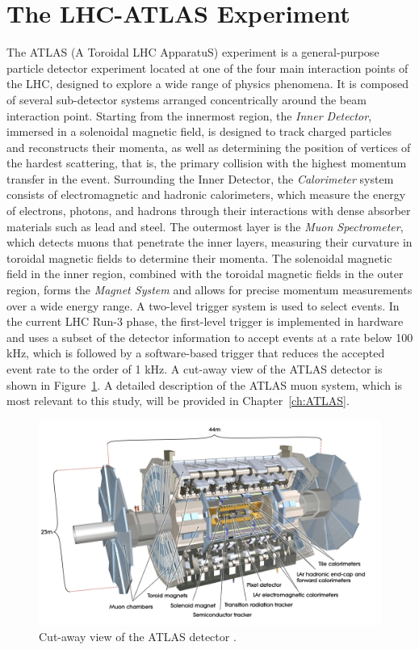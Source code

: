 \section{The LHC-ATLAS Experiment} \label{ATLAS}
The ATLAS (A Toroidal LHC ApparatuS) experiment is a general-purpose particle detector experiment located at one of the four main interaction points of the LHC, designed to explore a wide range of physics phenomena. It is composed of several sub-detector systems arranged concentrically around the beam interaction point. Starting from the innermost region, the \textit{Inner Detector}, immersed in a solenoidal magnetic field, is designed to track charged particles and reconstructs their momenta, as well as determining the position of vertices of the hardest scattering, that is, the primary collision with the highest momentum transfer in the event. Surrounding the Inner Detector, the \textit{Calorimeter} system consists of electromagnetic and hadronic calorimeters, which measure the energy of electrons, photons, and hadrons through their interactions with dense absorber materials such as lead and steel. The outermost layer is the \textit{Muon Spectrometer}, which detects muons that penetrate the inner layers, measuring their curvature in toroidal magnetic fields to determine their momenta. The solenoidal magnetic field in the inner region, combined with the toroidal magnetic fields in the outer region, forms the \textit{Magnet System} and allows for precise momentum measurements over a wide energy range. A two-level trigger system is used to select events. In the current LHC Run-3 phase, the first-level trigger is implemented in hardware and uses a subset of the detector information to accept events at a rate below 100 kHz, which is followed by a software-based trigger that reduces the accepted event rate to the order of 1 kHz. A cut-away view of the ATLAS detector is shown in Figure~\ref{fig:ATLASDetector}. A detailed description of the ATLAS muon system, which is most relevant to this study, will be provided in Chapter~\ref{ch:ATLAS}.
\begin{figure}[htbp]
  \centering
  \includegraphics[width=1.0\textwidth]{figs/chapter1/ATLAS.png}
  \caption{Cut-away view of the ATLAS detector \cite{ATLASDetector2008}.}
  \label{fig:ATLASDetector}
\end{figure}
